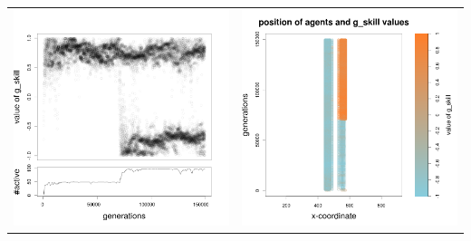 \documentclass[a4paper,10pt]{article}
\begin{document}
\begin{table}[H]
\begin{tabular}{cc}
\newline
\includegraphics[width=\imgSize]{../images/5StaticEnv/Gplot40_staticEnv4}&\includegraphics[width=\imgSize]{../images/5StaticEnv/Gplot40Static_staticEnv4}\\
\end{tabular}
\end{table}
\end{document}
